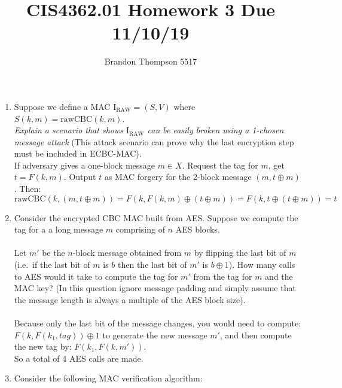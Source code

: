 \documentclass[a4paper]{article}
\begin{document}
	\title{CIS4362.01 Homework 3 Due 11/10/19}
	\author{Brandon Thompson 5517}
	\maketitle

	\begin{enumerate}
		\item Suppose we define a MAC $\text{I}_{\text{RAW}} = \left( S,V \right) $ where $S\left( k,m \right) = \text{rawCBC}\left( k,m \right) $.\\
			\textit{\emph{Explain a scenario that shows $\text{I}_{\text{RAW}}$ can be easily broken
			using a 1-chosen message attack}} (This attack scenario can prove why the
			last encryption step must be included in ECBC-MAC).\\
			If adversary gives a one-block message $m \in X$. Request the tag for $m$,
			get  $t = F\left( k,m \right) $. Output $t$ as MAC forgery for the 2-block
			message $\left( m, t\oplus m \right) $. Then:
			\begin{equation*}
				\text{rawCBC}\left( k,\left( m,t\oplus m \right)  \right) = F\left( k,F\left( k,m \right) \oplus \left( t\oplus m \right)  \right) = F\left( k,t\oplus \left( t\oplus m \right)  \right) = t
			\end{equation*}
		\item Consider the encrypted CBC MAC built from AES. Suppose we compute the tag for a
			a long message $m$ comprising of $n$ AES blocks.\\
			\\
			Let $m'$ be the $n$-block message obtained from $m$ by flipping the last bit
			of $m$ (i.e.\ if the last bit of $m$ is $b$ then the last bit of $m'$ is
			$b\oplus 1$). How many calls to AES would it take to compute the tag for $m'$ 
			from the tag for $m$ and the MAC key? (In this question ignore message
			padding and simply assume that the message length is always a multiple of
			the AES block size).\\
			\\
			Because only the last bit of the message changes, you would need to compute:
			$F\left( k,F\left( k_1,tag \right)  \right) \oplus 1$
			to generate the new message $m'$, and then compute the new tag by:
			$F\left( k_1,F\left( k,m' \right)  \right) $.\\
			So a total of 4 AES calls are made.
		\item Consider the following MAC verification algorithm:
			\begin{verbatim}

\end{verbatim}
\end{enumerate}
\end{document}
